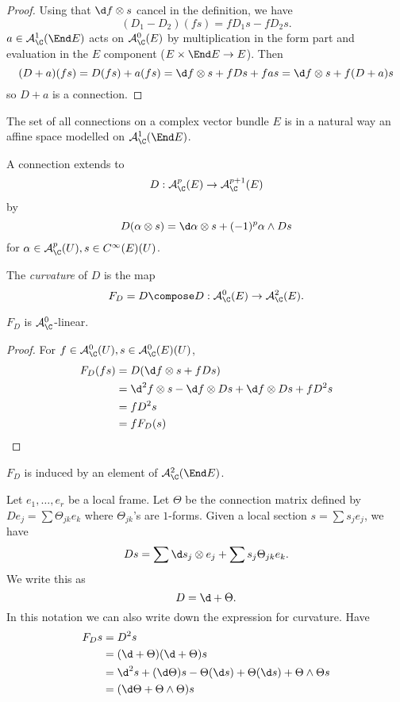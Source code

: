 \documentclass[a4paper]{article}
\newcommand{\w}{\wedge} %
\begin{document}
\begin{proof}
  Using that \(\d f \otimes s\) cancel in the definition, we have
  \[
    (D_1 - D_2)(fs) = f D_1 s - f D_2 s.
  \]
  \(a \in \mathcal A_\C^1(\End E)\) acts on \(\mathcal A^0_\C(E)\) by multiplication in the form part and evaluation in the \(E\) component (\(E \times \End E \to E\)). Then
  \[
    (D + a)(fs)
    = D(fs) + a(fs)
    = \d f \otimes s + f Ds + fas
    = \d f \otimes s + f(D + a) s
  \]
  so \(D + a\) is a connection.
\end{proof}

\begin{corollary}
  The set of all connections on a complex vector bundle \(E\) is in a natural way an affine space modelled on \(\mathcal A^1_\C(\End E)\).
\end{corollary}

A connection extends to
\[
  D: \mathcal A^p_\C(E) \to \mathcal A^{p + 1}_\C(E)
\]
by
\[
  D(\alpha \otimes s) = \d \alpha \otimes s + (-1)^p \alpha \w Ds
\]
for \(\alpha \in \mathcal A_\C^p(U), s \in C^\infty(E)(U)\).

\begin{definition}[curvature]
  The \emph{curvature} of \(D\) is the map
  \[
    F_D = D \compose D: \mathcal A^0_\C(E) \to \mathcal A^2_\C(E).
  \]
\end{definition}

\begin{lemma}
  \(F_D\) is \(\mathcal A_\C^0\)-linear.
\end{lemma}

\begin{proof}
  For \(f \in \mathcal A_\C^0(U), s \in \mathcal A_\C^0(E)(U)\),
  \begin{align*}
    F_D(fs)
    &= D(\d f \otimes s + f Ds) \\
    &= \d^2 f \otimes s - \d f \otimes Ds + \d f \otimes Ds + fD^2s \\
    &= fD^2s \\
    &= fF_D(s)
  \end{align*}
\end{proof}

\begin{corollary}
  \(F_D\) is induced by an element of \(\mathcal A_\C^2(\End E)\).
\end{corollary}

Let \(e_1, \dots, e_r\) be a local frame. Let \(\Theta\) be the connection matrix defined by \(D e_j = \sum \Theta_{jk} e_k\) where \(\Theta_{jk}\)'s are \(1\)-forms. Given a local section \(s = \sum s_j e_j\), we have
\[
  Ds = \sum \d s_j \otimes e_j + \sum s_j \Theta_{jk} e_k.
\]
We write this as
\[
  D = \d + \Theta.
\]
In this notation we can also write down the expression for curvature. Have
\begin{align*}
  F_D s
  &= D^2s \\
  &= (\d + \Theta)(\d + \Theta)s \\
  &= \d^2s + (\d \Theta)s - \Theta(\d s) + \Theta(\d s) + \Theta \w \Theta s \\
  &= (\d \Theta + \Theta \w \Theta) s
\end{align*}
\end{document}
